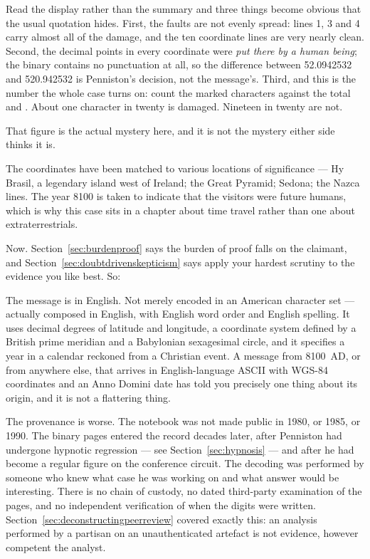 Read the display rather than the summary and three things become obvious that the usual
quotation hides. First, the faults are not evenly spread: lines 1, 3 and 4 carry almost all
of the damage, and the ten coordinate lines are very nearly clean. Second, the decimal points
in every coordinate were \emph{put there by a human being}; the binary contains no punctuation
at all, so the difference between 52.0942532 and 520.942532 is Penniston's decision, not the
message's. Third, and this is the number the whole case turns on: count the marked characters
against the total and . About one character in twenty is damaged. Nineteen in twenty are not.

That figure is the actual mystery here, and it is not the mystery either side thinks it is.

The coordinates have been matched to various locations of significance --- Hy Brasil, a
legendary island west of Ireland; the Great Pyramid; Sedona; the Nazca lines. The year 8100
is taken to indicate that the visitors were future humans, which is why this case sits in a
chapter about time travel rather than one about extraterrestrials.

Now. Section~\ref{sec:burdenproof} says the burden of proof falls on the claimant, and Section~\ref{sec:doubtdrivenskepticism} says apply
your hardest scrutiny to the evidence you like best. So:

The message is in English. Not merely encoded in an American character set --- actually
composed in English, with English word order and English spelling. It uses decimal degrees
of latitude and longitude, a coordinate system defined by a British prime meridian and a
Babylonian sexagesimal circle, and it specifies a year in a calendar reckoned from a
Christian event. A message from 8100~AD, or from anywhere else, that arrives in
English-language ASCII with WGS-84 coordinates and an Anno Domini date has told you
precisely one thing about its origin, and it is not a flattering thing.

The provenance is worse. The notebook was not made public in 1980, or 1985, or 1990. The
binary pages entered the record decades later, after Penniston had undergone hypnotic
regression --- see Section~\ref{sec:hypnosis} --- and after he had become a regular figure
on the conference circuit. The decoding was performed by someone who knew what case he was
working on and what answer would be interesting. There is no chain of custody, no dated
third-party examination of the pages, and no independent verification of when the digits
were written. Section~\ref{sec:deconstructingpeerreview} covered exactly this: an analysis performed by a partisan on an
unauthenticated artefact is not evidence, however competent the analyst.

